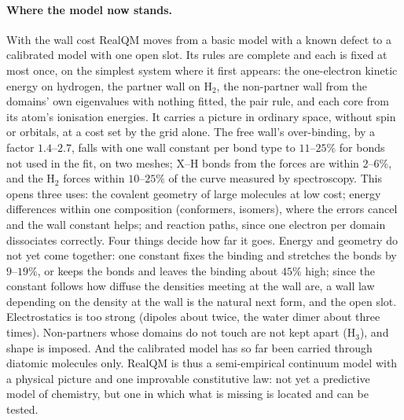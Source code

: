 \documentclass[11pt]{article}
\begin{document}
\paragraph{Where the model now stands.} With the wall cost RealQM moves from a basic model with a known
defect to a calibrated model with one open slot. Its rules are complete and each is fixed at most once, on
the simplest system where it first appears: the one-electron kinetic energy on hydrogen, the partner wall on
H$_2$, the non-partner wall from the domains' own eigenvalues with nothing fitted, the pair rule, and each core
from its atom's ionisation energies. It carries a picture in ordinary space, without spin or orbitals, at a
cost set by the grid alone. The free wall's over-binding, by a factor $1.4$--$2.7$, falls with one wall
constant per bond type to $11$--$25\%$ for bonds not used in the fit, on two meshes; X--H bonds from the
forces are within $2$--$6\%$, and the H$_2$ forces within $10$--$25\%$ of the curve measured by spectroscopy.
This opens three uses: the covalent geometry of large molecules at low cost; energy differences within one
composition (conformers, isomers), where the errors cancel and the wall constant helps; and reaction paths,
since one electron per domain dissociates correctly. Four things decide how far it goes. Energy and geometry do
not yet come together: one constant fixes the binding and stretches the bonds by $9$--$19\%$, or keeps the
bonds and leaves the binding about $45\%$ high; since the constant follows how diffuse the densities meeting at
the wall are, a wall law depending on the density at the wall is the natural next form, and the open slot.
Electrostatics is too strong (dipoles about twice, the water dimer about three times). Non-partners whose
domains do not touch are not kept apart (H$_3$), and shape is imposed. And the calibrated model has so far been
carried through diatomic molecules only. RealQM is thus a semi-empirical continuum model with a physical picture
and one improvable constitutive law: not yet a predictive model of chemistry, but one in which what is missing
is located and can be tested.
\end{document}
